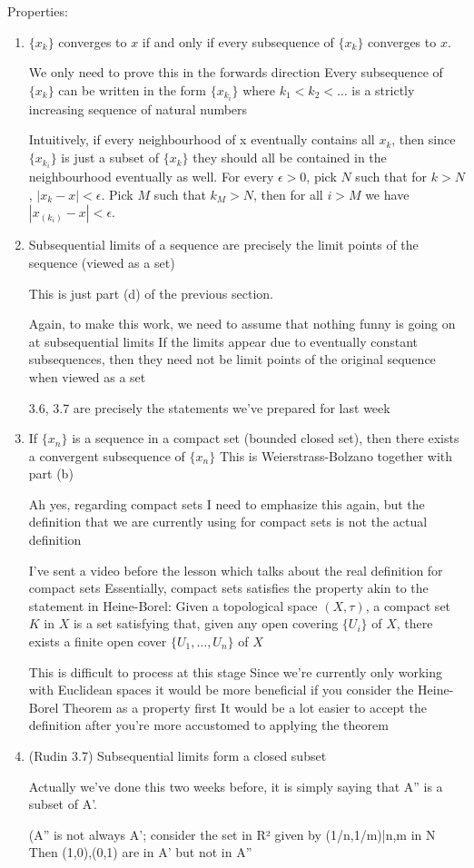 Properties:
\begin{enumerate}
\item $\{x_k\}$ converges to $x$ if and only if every subsequence of $\{x_k\}$ converges to $x$.

We only need to prove this in the forwards direction
Every subsequence of $\{x_k\}$ can be written in the form $\{x_{k_i}\}$ where $k_1<k_2<\dots$ is a strictly increasing sequence of natural numbers

Intuitively, if every neighbourhood of x eventually contains all $x_k$, then since $\{x_{k_i}\}$ is just a subset of $\{x_k\}$ they should all be contained in the neighbourhood eventually as well.
For every $\epsilon>0$, pick $N$ such that for $k>N$, $|x_k-x|<\epsilon$.
Pick $M$ such that $k_M>N$, then for all $i>M$ we have $|x_(k_i)-x|<\epsilon$.

\item Subsequential limits of a sequence are precisely the limit points of the sequence (viewed as a set)

This is just part (d) of the previous section.

Again, to make this work, we need to assume that nothing funny is going on at subsequential limits
If the limits appear due to eventually constant subsequences, then they need not be limit points of the original sequence when viewed as a set

3.6, 3.7 are precisely the statements we've prepared for last week

\item If $\{x_n\}$ is a sequence in a compact set (bounded closed set), then there exists a convergent subsequence of $\{x_n\}$
This is Weierstrass-Bolzano together with part (b)

Ah yes, regarding compact sets
I need to emphasize this again, but the definition that we are currently using for compact sets is not the actual definition

I've sent a video before the lesson which talks about the real definition for compact sets
Essentially, compact sets satisfies the property akin to the statement in Heine-Borel:
Given a topological space $(X,\tau)$, a compact set $K$ in $X$ is a set satisfying that, given any open covering $\{U_i\}$ of $X$, there exists a finite open cover $\{U_1,\dots,U_n\}$ of $X$

This is difficult to process at this stage
Since we're currently only working with Euclidean spaces it would be more beneficial if you consider the Heine-Borel Theorem as a property first
It would be a lot easier to accept the definition after you're more accustomed to applying the theorem

\item (Rudin 3.7) Subsequential limits form a closed subset

Actually we've done this two weeks before, it is simply saying that A'' is a subset of A'.


(A'' is not always A'; consider the set in R² given by
{(1/n,1/m)|n,m in N}
Then (1,0),(0,1) are in A' but not in A''
\end{enumerate}

